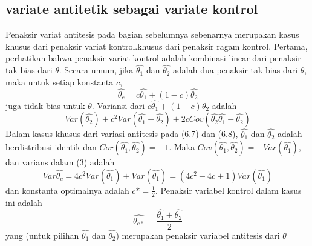 \documentclass[a4paper,12pt]{article}
\theoremstyle{definition}
\begin{document}
\subsection{variate antitetik sebagai variate kontrol}
Penaksir variat antitesis pada bagian sebelumnya sebenarnya merupakan kasus khusus dari penaksir variat kontrol.khusus dari penaksir ragam kontrol. Pertama, perhatikan bahwa penaksir variat kontrol adalah kombinasi linear dari penaksir tak bias dari $\theta$. Secara umum, jika $\widehat{\theta _{1}}$ dan $\widehat{\theta _{2}}$ adalah dua penaksir tak bias dari $\theta$, maka untuk setiap konstanta $c$,
\begin{equation*}
    \widehat{\theta_{c}}=c\widehat{\theta_{1}}+\left ( 1-c \right )\widehat{\theta_{2}}
\end{equation*}
juga tidak bias untuk $\theta$. Variansi dari $c\widehat{\theta_{1}}+\left ( 1-c \right )\widehat{\theta_{2}}$ adalah
\begin{equation}
    Var\left ( \widehat{\theta_{2}} \right )+c^{2}Var\left ( \widehat{\theta_{1}}-\widehat{\theta_{2}} \right )+2cCov\left ( \widehat{\theta_{2}}\widehat{\theta_{1}}-\widehat{\theta_{2}} \right )
\end{equation}
Dalam kasus khusus dari variasi antitesis pada (6.7) dan (6.8), $\widehat{\theta_{1}}$ dan $\widehat{\theta_{2}}$ adalah
berdistribusi identik dan $Cor\left ( \widehat{\theta_{1}},\widehat{\theta_{2}} \right )=-1$. Maka $Cov\left ( \widehat{\theta_{1}},\widehat{\theta_{2}} \right )=-Var\left ( \widehat{\theta_{1}} \right )$, dan varians dalam (3) adalah
\begin{equation*}
    Var\widehat{\theta_{c}}=4c^{2}Var\left ( \widehat{\theta_{1}} \right )+Var\left ( \widehat{\theta_{1}} \right )=\left ( 4c^{2}-4c+1 \right )Var\left ( \widehat{\theta_{1}} \right )
\end{equation*}
dan konstanta optimalnya adalah $c*=\frac{1}{2}$. Penaksir variabel kontrol dalam kasus ini adalah
\begin{equation*}
\widehat{\theta_{c*}}=\frac{\widehat{\theta_{1}}+\widehat{\theta_{2}}}{2}
\end{equation*}
yang (untuk pilihan $\widehat{\theta_{1}}$ dan $\widehat{\theta_{2}}$) merupakan penaksir variabel antitesis dari $\theta$
\end{document}
